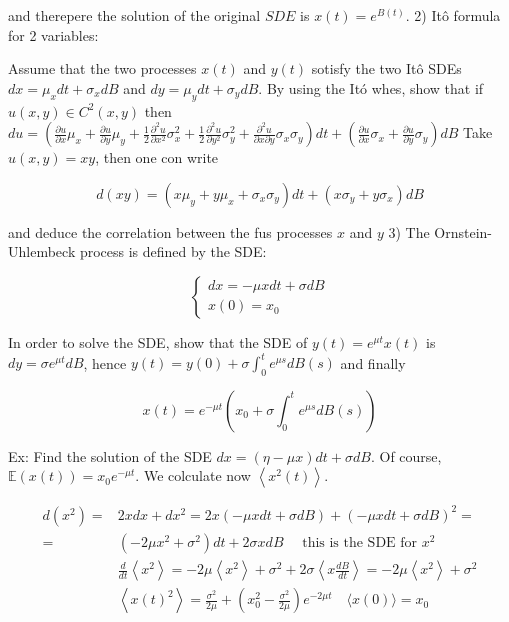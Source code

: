 and therepere the solution of the original $S D E$ is $x(t)=e^{B(t)}$.
2) Itô formula for 2 variables:

Assume that the two processes $x(t)$ and $y(t)$ sotisfy the two Itô SDEs $d x=\mu_{x} d t+\sigma_{x} d B$ and $d y=\mu_{y} d t+\sigma_{y} d B$. By using the Itó whes, show that if $u(x, y) \in C^{2}(x, y)$ then
$d u=\left(\frac{\partial u}{\partial x} \mu_{x}+\frac{\partial u}{\partial y} \mu_{y}+\frac{1}{2} \frac{\partial^{2} u}{\partial x^{2}} \sigma_{x}^{2}+\frac{1}{2} \frac{\partial^{2} u}{\partial y^{2}} \sigma_{y}^{2}+\frac{\partial^{2} u}{\partial x \partial y} \sigma_{x} \sigma_{y}\right) d t+\left(\frac{\partial u}{\partial x} \sigma_{x}+\frac{\partial u}{\partial y} \sigma_{y}\right) d B$
Take $u(x, y)=x y$, then one con write

$$
 d(x y)=\left(x \mu_{y}+y \mu_{x}+\sigma_{x} \sigma_{y}\right) d t+\left(x \sigma_{y}+y \sigma_{x}\right) d B
$$ 

and deduce the correlation between the fus processes $x$ and $y$
3) The Ornstein-Uhlembeck process is defined by the SDE:

$$
 \left\{
\begin{array}{l}
 d x=-\mu x d t+\sigma d B \\
x(0)=x_{0}
\end{array}\right.
$$ 

In order to solve the SDE, show that the SDE of $y(t)=e^{\mu t} x(t)$ is $d y=\sigma e^{\mu t} d B$, hence $y(t)=y(0)+\sigma \int_{0}^{t} e^{\mu s} d B(s)$ and finally

\begin{equation*}
x(t)=e^{-\mu t}\left(x_{0}+\sigma \int_{0}^{t} e^{\mu s} d B(s)\right) \tag{36}
\end{equation*}

Ex: Find the solution of the SDE $d x=( \eta-\mu x) d t+\sigma d B$.
Of course, $\mathbb{E}(x(t))=x_{0} e^{-\mu t}$. We colculate now $\left
\langle x^{2}(t)\right
\rangle$.


\begin{align*}
d\left(x^{2}\right)= & 2 x d x+d x^{2}=2 x(-\mu x d t+\sigma d B)+(-\mu x d t+\sigma d B)^{2}=
 \\
= & \left(-2 \mu x^{2}+\sigma^{2}\right) d t+2 \sigma x d B \quad \text{ this is the SDE for } x^{2} \\
& \frac{d}{d t}\left\langle x^{2}\right\rangle=-2 \mu\left\langle x^{2}\right\rangle+\sigma^{2}+2 \sigma\left
\langle x \frac{d B}{d t}\right
\rangle=-2 \mu\left
\langle x^{2}\right
\rangle+\sigma^{2} \\
& \left
\langle x(t)^{2}\right
\rangle=\frac{\sigma^{2}}{2 \mu}+\left(x_{0}^{2}-\frac{\sigma^{2}}{2 \mu}\right) e^{-2 \mu t} \quad\langle x(0)\rangle=x_{0} \tag{37}
\end{align*}


